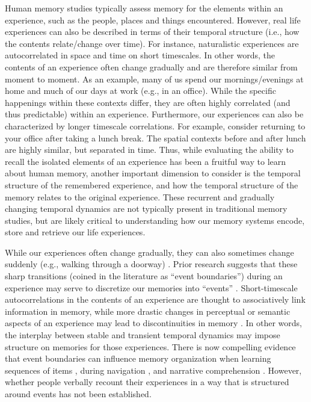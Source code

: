 \documentclass{article}
\begin{document}

Human memory studies typically assess memory for the elements within
an experience, such as the people, places and things
encountered. However, real life experiences can also be described in
terms of their temporal structure (i.e., how the contents
relate/change over time).  For instance, naturalistic experiences are
autocorrelated in space and time on short timescales. In other words,
the contents of an experience often change gradually and are therefore
similar from moment to moment. As an example, many of us spend our
mornings/evenings at home and much of our days at work (e.g., in an
office). While the specific happenings within these contexts differ,
they are often highly correlated (and thus predictable) within an
experience. Furthermore, our experiences can also be characterized by
longer timescale correlations. For example, consider returning to your
office after taking a lunch break. The spatial contexts before and
after lunch are highly similar, but separated in time. Thus, while
evaluating the ability to recall the isolated elements of an
experience has been a fruitful way to learn about human memory,
another important dimension to consider is the temporal structure of
the remembered experience, and how the temporal structure of the
memory relates to the original experience. These recurrent and
gradually changing temporal dynamics are not typically present in
traditional memory studies, but are likely critical to understanding
how our memory systems encode, store and retrieve our life
experiences.

While our experiences often change gradually, they can also sometimes change suddenly (e.g., walking through a doorway) \citep{RadvZack17}. Prior research suggests that these sharp transitions (coined in the literature as ``event boundaries'') during an experience may serve to discretize our memories into ``events'' \citep{RadvZack17, BrunEtal18, HeusEtal18, ClewDava17, EzzyDava11, DuBrDava13}. Short-timescale autocorrelations in the contents of an experience are thought to associatively link information in memory, while more drastic changes in perceptual or semantic aspects of an experience may lead to discontinuities in memory \citep{HeusEtal18, BrunEtal18, EzzyDava11, DuBrDava13}.  In other words, the interplay between stable and transient temporal dynamics may impose structure on memories for those experiences. There is now compelling evidence that event boundaries can influence memory organization when learning sequences of items \citep{HeusEtal18, DuBrDava13}, during navigation \citep{BrunEtal18}, and narrative comprehension \citep{ZwaaRadv98, EzzyDava11}.  However, whether people verbally recount their experiences in a way that is structured around events has not been established.
\end{document}
